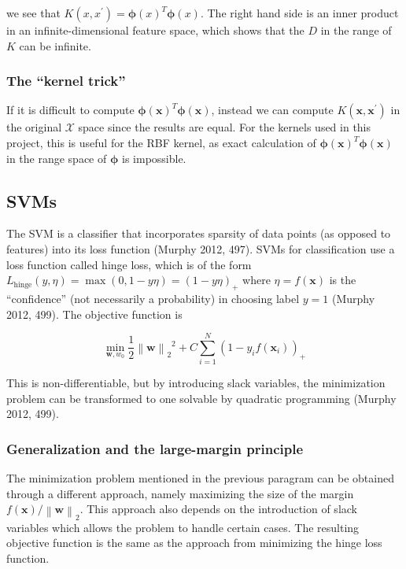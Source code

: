 \documentclass[letterpaper, 11pt]{article}
\newcommand{\norm}[1]{\left\lVert #1 \right\rVert}
\newcommand{\vect}[1]{\boldsymbol{#1}}
\begin{document}
we see that $K(x, x^\prime) = \vect{\phi}(x)^T \vect{\phi}(x)$. The right hand side is an inner product in an infinite-dimensional feature space, which shows that the $D$ in the range of $K$ can be infinite.

\subsubsection{The ``kernel trick''}

If it is difficult to compute $\vect{\phi}(\vect{x})^T \vect{\phi}(\vect{x})$, instead we can compute $K(\vect{x}, \vect{x}^\prime)$ in the original $\mathcal{X}$ space since the results are equal. For the kernels used in this project, this is useful for the RBF kernel, as exact calculation of $\vect{\phi}(\vect{x})^T \vect{\phi}(\vect{x})$ in the range space of $\vect{\phi}$ is impossible.

\subsection{SVMs}

The SVM is a classifier that incorporates sparsity of data points (as opposed to features) into its loss function (Murphy 2012, 497). SVMs for classification use a loss function called hinge loss, which is of the form $L_\text{hinge}(y, \eta) = \max(0, 1 - y \eta) = (1 - y\eta)_{+}$ where $\eta = f(\vect{x})$ is the ``confidence'' (not necessarily a probability) in choosing label $y = 1$ (Murphy 2012, 499). The objective function is

\begin{equation*}
  \min_{\vect{w}, w_0} \frac{1}{2}{\norm{\vect{w}}_2}^2 + C \sum_{i=1}^{N}(1 - y_i f(\vect{x}_i))_{+}
\end{equation*}

This is non-differentiable, but by introducing slack variables, the minimization problem can be transformed to one solvable by quadratic programming (Murphy 2012, 499).

\subsubsection{Generalization and the large-margin principle}

The minimization problem mentioned in the previous paragram can be obtained through a different approach, namely maximizing the size of the margin $f(\vect{x}) / \norm{\vect{w}}_2$. This approach also depends on the introduction of slack variables which allows the problem to handle certain cases. The resulting objective function is the same as the approach from minimizing the hinge loss function.
\end{document}
